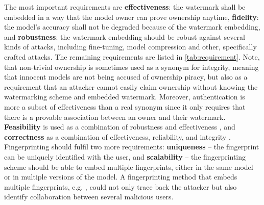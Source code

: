

The most important %
requirements are  \textbf{effectiveness}: the watermark shall be embedded in a way that the model owner can prove ownership anytime, \textbf{fidelity}: the model's accuracy shall not be degraded because of the watermark embedding, and \textbf{robustness}: the watermark embedding should be robust against several kinds of attacks, including fine-tuning, model compression and other, specifically crafted attacks.
%
The remaining requirements are listed in \cref{tab:requirement}. 
Note, that non-trivial ownership is sometimes used as a synonym for integrity, meaning that innocent models are not being accused of ownership piracy, but also as a requirement that an attacker cannot easily claim ownership without knowing the watermarking scheme and embedded watermark. Moreover, authentication is more a subset of effectiveness than a real synonym since it only requires that there is a provable association between an owner and their watermark. \textbf{Feasibility} is used as a combination of robustness and effectiveness \cite{li_how_2019}, and \textbf{correctness} as a combination of effectiveness, reliability, and integrity \cite{lukas_deep_2020}. Fingerprinting should fulfil two more requirements: \textbf{uniqueness} -- the fingerprint can be uniquely identified with the user, and \textbf{scalability} -- the fingerprinting scheme should be able to embed multiple fingerprints, either in the same model or in multiple versions of the model. A fingerprinting method that embeds multiple fingerprints, e.g. \cite{chen_deepmarks_2019}, could not only trace back the attacker but also identify collaboration between several malicious users.
 


